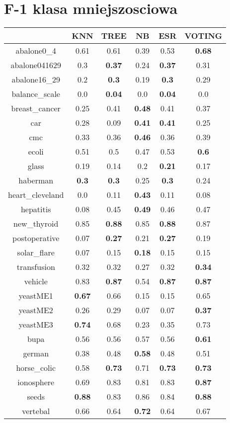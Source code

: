 \documentclass{article}%
\begin{document}
%
\section*{F{-}1 klasa mniejszosciowa}%
\begin{tabular}{c|ccccc}%
\hline%
&KNN&TREE&NB&ESR&VOTING\\%
\hline%
abalone0\_4&0.61&0.61&0.39&0.53&\textbf{0.68}\\%
\hline%
abalone041629&0.3&\textbf{0.37}&0.24&\textbf{0.37}&0.31\\%
\hline%
abalone16\_29&0.2&\textbf{0.3}&0.19&\textbf{0.3}&0.29\\%
\hline%
balance\_scale&0.0&\textbf{0.04}&0.0&\textbf{0.04}&0.0\\%
\hline%
breast\_cancer&0.25&0.41&\textbf{0.48}&0.41&0.37\\%
\hline%
car&0.28&0.09&\textbf{0.41}&\textbf{0.41}&0.25\\%
\hline%
cmc&0.33&0.36&\textbf{0.46}&0.36&0.39\\%
\hline%
ecoli&0.51&0.5&0.47&0.53&\textbf{0.6}\\%
\hline%
glass&0.19&0.14&0.2&\textbf{0.21}&0.17\\%
\hline%
haberman&\textbf{0.3}&\textbf{0.3}&0.25&\textbf{0.3}&0.24\\%
\hline%
heart\_cleveland&0.0&0.11&\textbf{0.43}&0.11&0.08\\%
\hline%
hepatitis&0.08&0.45&\textbf{0.49}&0.46&0.47\\%
\hline%
new\_thyroid&0.85&\textbf{0.88}&0.85&\textbf{0.88}&0.87\\%
\hline%
postoperative&0.07&\textbf{0.27}&0.21&\textbf{0.27}&0.19\\%
\hline%
solar\_flare&0.07&0.15&\textbf{0.18}&0.15&0.15\\%
\hline%
transfusion&0.32&0.32&0.27&0.32&\textbf{0.34}\\%
\hline%
vehicle&0.83&\textbf{0.87}&0.54&\textbf{0.87}&\textbf{0.87}\\%
\hline%
yeastME1&\textbf{0.67}&0.66&0.15&0.15&0.65\\%
\hline%
yeastME2&0.26&0.29&0.07&0.07&\textbf{0.37}\\%
\hline%
yeastME3&\textbf{0.74}&0.68&0.23&0.35&0.73\\%
\hline%
bupa&0.56&0.56&0.57&0.56&\textbf{0.61}\\%
\hline%
german&0.38&0.48&\textbf{0.58}&0.48&0.51\\%
\hline%
horse\_colic&0.58&\textbf{0.73}&0.71&\textbf{0.73}&\textbf{0.73}\\%
\hline%
ionosphere&0.69&0.83&0.81&0.83&\textbf{0.87}\\%
\hline%
seeds&\textbf{0.88}&0.83&0.86&0.84&\textbf{0.88}\\%
\hline%
vertebal&0.66&0.64&\textbf{0.72}&0.64&0.67\\%
\hline%
\end{tabular}
\end{document}
